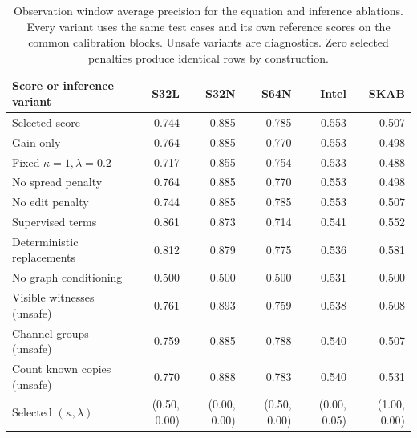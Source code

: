 \begin{table}[t]
\centering\small
\caption{Observation window average precision for the equation and inference ablations. Every variant uses the same test cases and its own reference scores on the common calibration blocks. Unsafe variants are diagnostics. Zero selected penalties produce identical rows by construction.}\label{tab:ablation}
\begin{tabular}{lrrrrr}
\toprule
Score or inference variant & S32L & S32N & S64N & Intel & SKAB \\
\midrule
Selected score & 0.744 & 0.885 & 0.785 & 0.553 & 0.507 \\
Gain only & 0.764 & 0.885 & 0.770 & 0.553 & 0.498 \\
Fixed $\kappa=1,\lambda=0.2$ & 0.717 & 0.855 & 0.754 & 0.533 & 0.488 \\
No spread penalty & 0.764 & 0.885 & 0.770 & 0.553 & 0.498 \\
No edit penalty & 0.744 & 0.885 & 0.785 & 0.553 & 0.507 \\
Supervised terms & 0.861 & 0.873 & 0.714 & 0.541 & 0.552 \\
Deterministic replacements & 0.812 & 0.879 & 0.775 & 0.536 & 0.581 \\
No graph conditioning & 0.500 & 0.500 & 0.500 & 0.531 & 0.500 \\
Visible witnesses (unsafe) & 0.761 & 0.893 & 0.759 & 0.538 & 0.508 \\
Channel groups (unsafe) & 0.759 & 0.885 & 0.788 & 0.540 & 0.507 \\
Count known copies (unsafe) & 0.770 & 0.888 & 0.783 & 0.540 & 0.531 \\
\midrule
Selected $(\kappa,\lambda)$ & (0.50, 0.00) & (0.00, 0.00) & (0.50, 0.00) & (0.00, 0.05) & (1.00, 0.00) \\
\bottomrule
\end{tabular}
\end{table}
